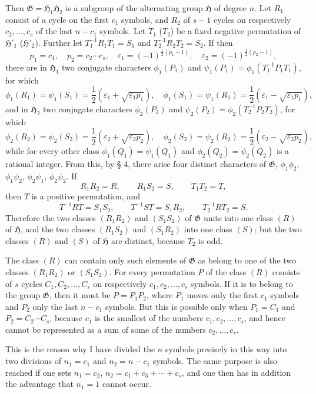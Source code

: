 \documentclass[11pt]{article}
\newcommand{\Hgr}{\mathfrak{H}}
\newcommand{\Ggr}{\mathfrak{G}}
\newcommand{\eps}{\varepsilon}
\begin{document}
Then $\Ggr=\Hgr_1\Hgr_2$ is a subgroup of the alternating group $\Hgr$ of degree $n$. Let $R_1$ consist of a cycle on the first $c_1$ symbols, and $R_2$ of $s-1$ cycles on respectively $c_2,\ldots,c_s$ of the last $n-c_1$ symbols. Let $T_1$ ($T_2$) be a fixed negative permutation of $\Hgr'_1$ ($\Hgr'_2$). Further let $T_1^{-1}R_1T_1=S_1$ and $T_2^{-1}R_2T_2=S_2$. If then
\[
 p_1=c_1,	\quad p_2=c_2\cdots c_s,	\quad \eps_1=(-1)^{\frac12(p_1-1)},	\quad \eps_2=(-1)^{\frac12(p_2-1)},
\]
there are in $\Hgr_1$ two conjugate characters $\phi_1(P_1)$ and $\psi_1(P_1)=\phi_1(T_1^{-1}P_1T_1)$, for which
\[
 \phi_1(R_1)=\psi_1(S_1)=\frac12(\eps_1+\sqrt{\eps_1p_1}),	\quad
 \phi_1(S_1)=\psi_1(R_1)=\frac12(\eps_1-\sqrt{\eps_1p_1}),
\]
and in $\Hgr_2$ two conjugate characters $\phi_2(P_2)$ and $\psi_2(P_2)=\phi_2(T_2^{-1}P_2T_2)$, for which
\[
 \phi_2(R_2)=\psi_2(S_2)=\frac12(\eps_2+\sqrt{\eps_2p_2}),	\quad
 \phi_2(S_2)=\psi_2(R_2)=\frac12(\eps_2-\sqrt{\eps_2p_2}),
\]
while for every other class $\phi_1(Q_1)=\psi_1(Q_1)$ and $\phi_2(Q_2)=\psi_2(Q_2)$ is a rational integer. From this, by § 4, there arise four distinct characters of $\Ggr$, $\phi_1\phi_2$, $\phi_1\psi_2$, $\phi_2\psi_1$, $\phi_2\psi_2$. If
\[
 R_1R_2=R,	\qquad R_1S_2=S,	\qquad T_1T_2=T,
\]
then $T$ is a positive permutation, and
\[
 T^{-1}RT=S_1S_2,	\qquad T^{-1}ST=S_1R_2,	\qquad T_2^{-1}RT_2=S.
\]
Therefore the two classes $(R_1R_2)$ and $(S_1S_2)$ of $\Ggr$ unite into one class $(R)$ of $\Hgr$, and the two classes $(R_1S_2)$ and $(S_1R_2)$ into one class $(S)$; but the two classes $(R)$ and $(S)$ of $\Hgr$ are distinct, because $T_2$ is odd.

The class $(R)$ can contain only such elements of $\Ggr$ as belong to one of the two classes $(R_1R_2)$ or $(S_1S_2)$. For every permutation $P$ of the class $(R)$ consists of $s$ cycles $C_1,C_2,\ldots,C_s$ on respectively $c_1,c_2,\ldots,c_s$ symbols. If it is to belong to the group $\Ggr$, then it must be $P=P_1P_2$, where $P_1$ moves only the first $c_1$ symbols and $P_2$ only the last $n-c_1$ symbols. But this is possible only when $P_1=C_1$ and $P_2=C_2\cdots C_s$, because $c_1$ is the smallest of the numbers $c_1,c_2,\ldots,c_s$, and hence cannot be represented as a sum of some of the numbers $c_2,\ldots,c_s$.

This is the reason why I have divided the $n$ symbols precisely in this way into two divisions of $n_1=c_1$ and $n_2=n-c_1$ symbols. The same purpose is also reached if one sets $n_1=c_2$, $n_2=c_1+c_3+\cdots+c_s$, and one then has in addition the advantage that $n_1=1$ cannot occur.
\end{document}
